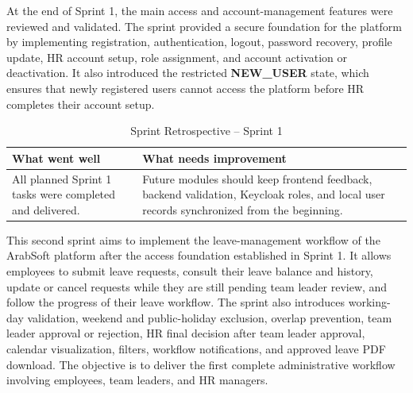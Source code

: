
{\fontsize{12}{18}\selectfont
\setlength{\parindent}{1.2cm}
\setlength{\parskip}{6pt}

\indent At the end of Sprint 1, the main access and account-management features were reviewed and validated. The sprint provided a secure foundation for the platform by implementing registration, authentication, logout, password recovery, profile update, HR account setup, role assignment, and account activation or deactivation. It also introduced the restricted \textbf{NEW\_USER} state, which ensures that newly registered users cannot access the platform before HR completes their account setup.

}



\begin{table}[H]
\centering
\renewcommand{\arraystretch}{1.7}
\setlength{\tabcolsep}{8pt}
\begin{tabular}{|>{\RaggedRight\arraybackslash}m{6.2cm}|>{\RaggedRight\arraybackslash}m{6.2cm}|}
\hline
\rowcolor{blue!20}
\centering\textbf{What went well} & \centering\textbf{What needs improvement} \tabularnewline
\hline
All planned Sprint 1 tasks were completed and delivered.
&
Future modules should keep frontend feedback, backend validation, Keycloak roles, and local user records synchronized from the beginning.
\\
\hline
\end{tabular}
\caption{Sprint Retrospective -- Sprint 1}
\label{tab:sprint1_retrospective}
\end{table}



\clearpage
{}


{\fontsize{12}{18}\selectfont
\setlength{\parindent}{1.2cm}
\setlength{\parskip}{6pt}

\indent This second sprint aims to implement the leave-management workflow of the ArabSoft platform after the access foundation established in Sprint 1.
It allows employees to submit leave requests, consult their leave balance and history, update or cancel requests while they are still pending team leader review, and follow the progress of their leave workflow.
The sprint also introduces working-day validation, weekend and public-holiday exclusion, overlap prevention, team leader approval or rejection, HR final decision after team leader approval, calendar visualization, filters, workflow notifications, and approved leave PDF download.
The objective is to deliver the first complete administrative workflow involving employees, team leaders, and HR managers.

}

